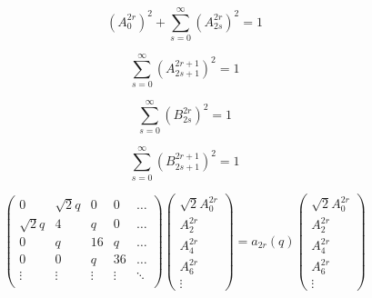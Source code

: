 \documentclass{article}
\begin{document}
\begin{equation}
    \left(A_0^{2r}\right)^2 + \sum_{s=0}^\infty \left(A_{2s}^{2r}\right)^2 = 1
\end{equation}

\begin{equation}
    \sum_{s=0}^\infty \left(A_{2s+1}^{2r+1}\right)^2 = 1
\end{equation}

\begin{equation}
    \sum_{s=0}^\infty \left(B_{2s}^{2r}\right)^2 = 1
\end{equation}

\begin{equation}
    \sum_{s=0}^\infty \left(B_{2s+1}^{2r+1}\right)^2 = 1
\end{equation}

\begin{equation}
    \left(
    \begin{matrix}
        0 & \sqrt{2}q & 0 & 0 & \dots \\
        \sqrt{2}q & 4 & q & 0 & \dots \\
        0 & q & 16 & q & \dots \\
        0 & 0 & q & 36 & \dots \\
        \vdots & \vdots & \vdots & \vdots & \ddots \\

    \end{matrix}
    \right)
    \left(
    \begin{matrix}
        \sqrt{2}A_0^{2r} \\
        A_2^{2r}\\
        A_4^{2r}\\
        A_6^{2r}\\
        \vdots
    \end{matrix}
    \right)
    = a_{2r}(q)
    \left(
    \begin{matrix}
        \sqrt{2}A_0^{2r} \\
        A_2^{2r}\\
        A_4^{2r}\\
        A_6^{2r}\\
        \vdots
    \end{matrix}
    \right)
\end{equation}
\end{document}
